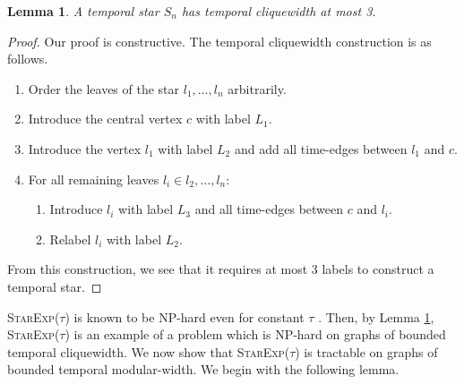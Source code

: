 \documentclass[preprint,12pt]{elsarticle}
\newtheorem{lemma}{Lemma}
\begin{document}
\begin{lemma}\label{lem:star-cw}
    A temporal star $S_n$ has temporal cliquewidth at most 3.
\end{lemma}
\begin{proof}
    Our proof is constructive. The temporal cliquewidth construction is as follows.
    \begin{enumerate}
        \item Order the leaves of the star $l_1,\ldots,l_n$ arbitrarily.
        \item Introduce the central vertex $c$ with label $L_1$.
        \item Introduce the vertex $l_1$ with label $L_2$ and add all time-edges between $l_1$ and $c$.
        \item For all remaining leaves $l_i \in l_2,\ldots,l_n$:
        \begin{enumerate}
            \item Introduce $l_i$ with label $L_3$ and all time-edges between $c$ and $l_i$.
            \item Relabel $l_i$ with label $L_2$.
        \end{enumerate}
    \end{enumerate}
    From this construction, we see that it requires at most 3 labels to construct a temporal star.
\end{proof}
\textsc{StarExp($\tau$)} is known to be NP-hard even for constant $\tau$ \cite{akrida_temporal_2021, bumpus_edge_2023}. Then, by Lemma \ref{lem:star-cw}, \textsc{StarExp($\tau$)} is an example of a problem which is NP-hard on graphs of bounded temporal cliquewidth. We now show that \textsc{StarExp($\tau$)} is tractable on graphs of bounded temporal modular-width. We begin with the following lemma.
\end{document}

